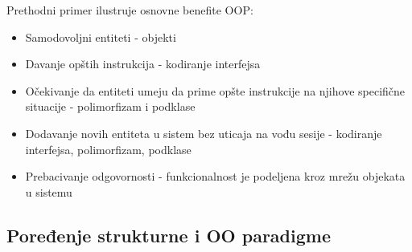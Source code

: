 \documentclass[../main.tex]{subfiles}
\begin{document}
Prethodni primer ilustruje osnovne benefite OOP:
\begin{itemize}
\item Samodovoljni entiteti - objekti
\item Davanje opštih instrukcija - kodiranje interfejsa
\item Očekivanje da entiteti umeju da prime opšte instrukcije na njihove specifične situacije - polimorfizam i podklase
\item Dodavanje novih entiteta u sistem bez uticaja na vođu sesije - kodiranje interfejsa, polimorfizam, podklase
\item Prebacivanje odgovornosti - funkcionalnost je podeljena kroz mrežu objekata u sistemu
\end{itemize}

\subsection{Poređenje strukturne i OO paradigme}
\end{document}
